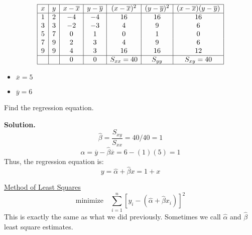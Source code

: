 \begin{exbox}
    \begin{example}
        \[
            \begin{array}{|c|c|c|c|c|c|c|}
                \hline
                x & y & x-\overline{x} & y-\overline{y} & (x-\overline{x})^2 & (y-\overline{y})^2 & (x-\overline{x})(y-\overline{y}) \\
                \hline
                1 & 2 & -4             & -4             & 16                 & 16                 & 16                               \\
                3 & 3 & -2             & -3             & 4                  & 9                  & 6                                \\
                5 & 7 & 0              & 1              & 0                  & 1                  & 0                                \\
                7 & 9 & 2              & 3              & 4                  & 9                  & 6                                \\
                9 & 9 & 4              & 3              & 16                 & 16                 & 12                               \\
                \hline
                  &   & 0              & 0              & S_{xx}=40          & S_{yy}             & S_{xy}= 40                       \\
                \hline
            \end{array}
        \]
        \begin{itemize}
            \item $ \overline{x} = 5 $
            \item $ \overline{y} = 6 $
        \end{itemize}
        Find the regression equation.

        \textbf{Solution.}
        \[ \hat{\beta}=\frac{S_{xy}}{S_{xx}}=40/40=1  \]
        \[ \hat{\alpha}=\overline{y}-\hat{\beta}\overline{x}=6-(1)(5)=1 \]
        Thus, the regression equation is:
        \[ y=\hat{\alpha}+\hat{\beta}x=1+x \]
    \end{example}
\end{exbox}

\underline{Method of Least Squares}
\[ \text{minimize}\quad \sum\limits_{i=1}^{n} \left[ y_i-(\hat{\alpha}+\hat{\beta}x_i) \right]^2 \]
This is exactly the same as what we did previously. Sometimes we call
$ \hat{\alpha} $ and $ \hat{\beta} $ least square estimates.


